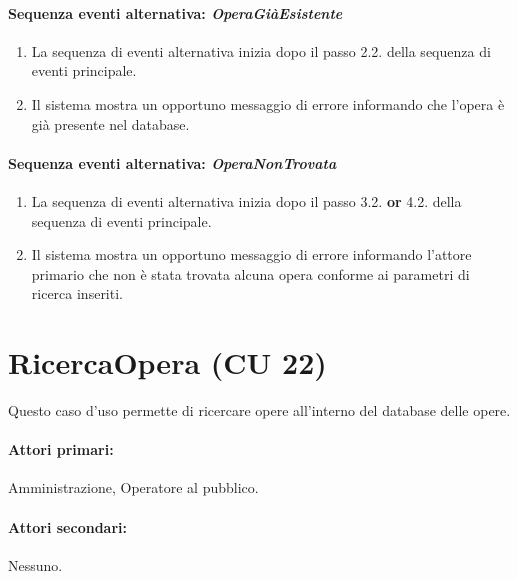 \documentclass{article}
\begin{document}
	
	\paragraph{Sequenza eventi alternativa: \textit{OperaGiàEsistente}}
	\begin{enumerate}	[leftmargin=28pt]
			\item  La sequenza di eventi alternativa inizia dopo il passo 2.2. della sequenza di eventi principale.
			\item  Il sistema mostra un opportuno messaggio di errore informando che l'opera è già presente nel database.
		\end{enumerate}
		
	\paragraph{Sequenza eventi alternativa: \textit{OperaNonTrovata}}
	\begin{enumerate}	[leftmargin=28pt]
			\item  La sequenza di eventi alternativa inizia dopo il passo 3.2. \textbf{or} 4.2. della sequenza di eventi principale.
			\item  Il sistema mostra un opportuno messaggio di errore informando l'attore primario che non è stata trovata alcuna opera conforme ai parametri di ricerca inseriti.
		\end{enumerate}
	
	
	
	
	
	
	
	
	
	
	
	\newpage 
	
	\section*{RicercaOpera (CU 22)}
	
	\indent\indent Questo caso d'uso permette di ricercare opere all'interno del database delle opere.
	
	\paragraph{Attori primari:}Amministrazione, Operatore al pubblico.
	
	\paragraph{Attori secondari:}Nessuno.
	
\end{document}
